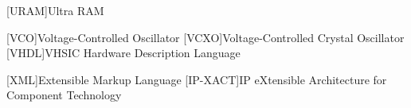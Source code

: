 [URAM]{Ultra RAM}

[VCO]{Voltage-Controlled Oscillator}
[VCXO]{Voltage-Controlled Crystal Oscillator}
[VHDL]{VHSIC Hardware Description Language}

[XML]{Extensible Markup Language}
[IP-XACT]{IP eXtensible Architecture for Component Technology}
